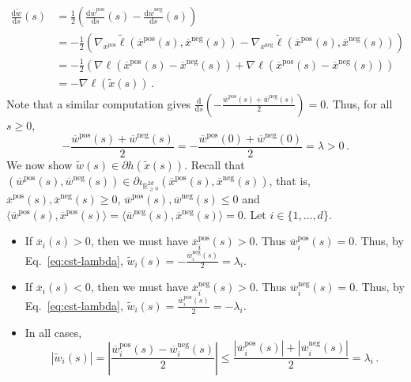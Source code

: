 \documentclass[11pt,english,reqno]{article}
\newcommand{\diff}{\mathrm{d}}
\newcommand{\R}{\mathbb{R}}
\newcommand{\pos}{\text{pos}}
\renewcommand{\neg}{\text{neg}}
\renewcommand{\leq}{\leqslant}
\renewcommand{\geq}{\geqslant}
\theoremstyle{plain}
\theoremstyle{definition}
\theoremstyle{remark}
\numberwithin{equation}{section}
\begin{document}
\begin{align*}
	\frac{\diff \widetilde{w}}{\diff s}(s) &= \frac{1}{2} \left(\frac{\diff \overline{w}^\pos}{\diff s}(s) - \frac{\diff \overline{w}^\neg}{\diff s}(s)\right) \\
	&= -\frac{1}{2} \left(\nabla_{x^\pos} \widetilde{\ell}(\overline{x}^\pos(s), \overline{x}^\neg(s)) - \nabla_{x^\neg} \widetilde{\ell}(\overline{x}^\pos(s), \overline{x}^\neg(s))\right) \\
	&= -\frac{1}{2} \left(\nabla \ell(\overline{x}^\pos(s) - \overline{x}^\neg(s)) + \nabla \ell(\overline{x}^\pos(s) - \overline{x}^\neg(s))\right) \\
	&= -\nabla \ell(\widetilde{x}(s)) \, .
\end{align*}
Note that a similar computation gives $\frac{\diff}{\diff s}\left(-\frac{\overline{w}^\pos(s)+\overline{w}^\neg(s)}{2}\right) = 0$. Thus, for all $s \geq 0$, 
\begin{equation}
	\label{eq:cst-lambda}
	-\frac{\overline{w}^\pos(s)+\overline{w}^\neg(s)}{2} = -\frac{\overline{w}^\pos(0)+\overline{w}^\neg(0)}{2} = \lambda > 0 \, .
\end{equation}
We now show $\widetilde{w}(s) \in \partial h(\widetilde{x}(s))$. Recall that $(\overline{w}^\pos(s), \overline{w}^\neg(s)) \in \partial \iota_{\R^{2d}_{\geq 0}}(\overline{x}^\pos(s), \overline{x}^\neg(s))$, that is, $\overline{x}^\pos(s), \overline{x}^\neg(s) \geq 0$, $\overline{w}^\pos(s), \overline{w}^\neg(s) \leq 0$ and $\langle \overline{w}^\pos(s), \overline{x}^\pos(s) \rangle = \langle \overline{w}^\neg(s), \overline{x}^\neg(s) \rangle = 0$. Let $i \in \{1, \dots, d\}$. 
\begin{itemize}
	\item If $\overline{x}_i(s) > 0$, then we must have $\overline{x}_i^\pos(s) > 0$. Thus $\overline{w}_i^\pos(s) = 0$. Thus, by Eq.~\eqref{eq:cst-lambda}, $\widetilde{w}_i(s) = -\frac{\overline{w}_i^\neg(s)}{2} = \lambda_i$. 
	\item If $\overline{x}_i(s) < 0$, then we must have $\overline{x}_i^\neg(s) > 0$. Thus $\overline{w}_i^\neg(s) = 0$. Thus, by Eq.~\eqref{eq:cst-lambda}, $\widetilde{w}_i(s) = \frac{\overline{w}_i^\pos(s)}{2} = -\lambda_i$.
	\item In all cases,
	\begin{equation*}
		\left\vert \widetilde{w}_i(s)\right\vert = \left\vert \frac{\overline{w}_i^\pos(s)- \overline{w}_i^\neg(s)}{2}\right\vert \leq \frac{\left\vert \overline{w}_i^\pos(s)\right\vert + \left\vert \overline{w}_i^\neg(s)\right\vert}{2} = \lambda_i \, .
	\end{equation*}
\end{itemize} 
\end{document}
